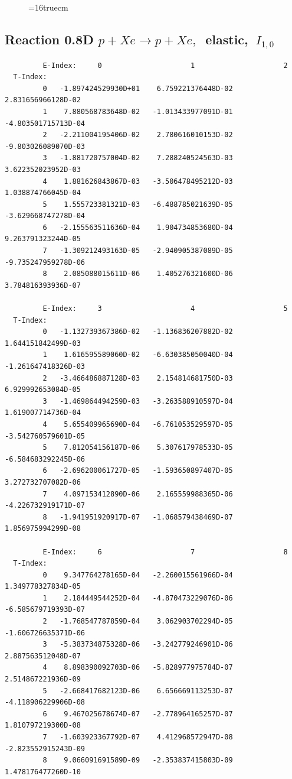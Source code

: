 \documentclass[12pt,dvips]{article}
\begin{document}
\begin{figure} \label{0.8T}
\epsfxsize=16truecm
\end{figure}

\newpage

\subsection{
Reaction 0.8D  $p + Xe \rightarrow p + Xe ,\ $
 elastic, $\  I_{1,0}$
}

\begin{small}\begin{verbatim}
         E-Index:     0                     1                     2
  T-Index:
         0   -1.897424529930D+01    6.759221376448D-02    2.831656966128D-02
         1    7.880568783648D-02   -1.013433977091D-01   -4.803501715713D-04
         2   -2.211004195406D-02    2.780616010153D-02   -9.803026089070D-03
         3   -1.881720757004D-02    7.288240524563D-03    3.622352023952D-03
         4    1.881626843867D-03   -3.506478495212D-03    1.038874766045D-04
         5    1.555723381321D-03   -6.488785021639D-05   -3.629668747278D-04
         6   -2.155563511636D-04    1.904734853680D-04    9.263791323244D-05
         7   -1.309212493163D-05   -2.940905387089D-05   -9.735247959278D-06
         8    2.085088015611D-06    1.405276321600D-06    3.784816393936D-07

         E-Index:     3                     4                     5
  T-Index:
         0   -1.132739367386D-02   -1.136836207882D-02    1.644151842499D-03
         1    1.616595589060D-02   -6.630385050040D-04   -1.261647418326D-03
         2   -3.466486887128D-03    2.154814681750D-03    6.929992653084D-05
         3   -1.469864494259D-03   -3.263588910597D-04    1.619007714736D-04
         4    5.655409965690D-04   -6.761053529597D-05   -3.542760579601D-05
         5    7.812054156187D-06    5.307617978533D-05   -6.584683292245D-06
         6   -2.696200061727D-05   -1.593650897407D-05    3.272732707082D-06
         7    4.097153412890D-06    2.165559988365D-06   -4.226732919171D-07
         8   -1.941951920917D-07   -1.068579438469D-07    1.856975994299D-08

         E-Index:     6                     7                     8
  T-Index:
         0    9.347764278165D-04   -2.260015561966D-04    1.349778327834D-05
         1    2.184449544252D-04   -4.870473229076D-06   -6.585679719393D-07
         2   -1.768547787859D-04    3.062903702294D-05   -1.606726635371D-06
         3   -5.383734875328D-06   -3.242779246901D-06    2.887563512048D-07
         4    8.898390092703D-06   -5.828977975784D-07    2.514867221936D-09
         5   -2.668417682123D-06    6.656669113253D-07   -4.118906229906D-08
         6    9.467025678674D-07   -2.778964165257D-07    1.810797219300D-08
         7   -1.603923367792D-07    4.412968572947D-08   -2.823552915243D-09
         8    9.066091691589D-09   -2.353837415803D-09    1.478176477260D-10
\end{verbatim}\end{small}
\end{document}
